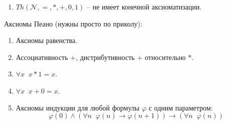 \begin{example}
\begin{enumerate}
\begin{proof}
            $(T, \varphi)$ совместен $\Rightarrow$ существует НБЧС модель $M_1$.

            $(T, \lnot \varphi)$ совместен $\Rightarrow$ существует НБЧС модель $M_2$.

            У теории $T$ нет конечных моделей, поэтому $M_1$ и $M_2$ счетны. Но тогда получаем, что $M_1$ и $M_2$ изоморфны, что является противоречием, потому что значение на формуле $\varphi$ будут разными.
        \end{proof}
        \begin{follow}
            $T$ является конечной аксиоматизацией теории $Th(\mathbb{Q}, =, \leqslant)$.
        \end{follow}
        \begin{proof}
            Ну действительно, раз $T$ полная, то либо формула, либо ее отрицание следуют из $T$. В интерпретации $(\mathbb{Q}, =, \leqslant)$ все формулы $T$ истинны, значит, только истинные формулы фогут из нее следовать. А это и есть все формулы $Th(\mathbb{Q}, =, \leqslant)$.
        \end{proof}
        Одновременно еще доказали, что $Th(\mathbb{Q}, =, \leqslant)$ является разрешимой, потому что имеет конечную аксиоматизацию и является полной. Другой способ доказательства разрешимости -- элиминация кванторов.
        \item $Th(\mathcal{N}, =, *, +, 0, 1)$ -- не имеет конечной аксиоматизации.
    \end{enumerate}
    Аксиомы Пеано (нужны просто по приколу): \begin{enumerate}
        \item Аксиомы равенства.
        \item Ассоциативность $+$, дистрибутивность $+$ относительно $*$.
        \item $\forall x \;\; x * 1 = x$.
        \item $\forall x \;\; x + 0 = x$.
        \item Аксиомы индукции для любой формулы $\varphi$ с одним параметром: \[ \varphi(0) \land (\forall n \;\; \varphi(n) \to \varphi(n + 1)) \to (\forall n \;\; \varphi(n)) \]
        
    \end{enumerate}
\end{example}